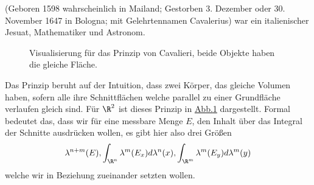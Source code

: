 \documentclass[letterpaper,10pt,german]{jupyterBook}
\let\sphinxpxdimen\pdfpxdimen\else\newdimen\sphinxpxdimen
\begin{document}
\begin{sphinxShadowBox}

\sphinxAtStartPar
{} (Geboren 1598 wahrscheinlich in Mailand; Gestorben 3. Dezember oder 30. November 1647 in Bologna; mit Gelehrtennamen Cavalerius) war ein italienischer Jesuat, Mathematiker und Astronom.
\end{sphinxShadowBox}

\begin{figure}[htbp]
\centering
\capstart

\noindent\sphinxincludegraphics[width=400\sphinxpxdimen]{{cavalieri}.jpg}
\caption{Visualisierung für das Prinzip von Cavalieri, beide Objekte haben die gleiche Fläche.}\label{\detokenize{masstheorie/integrationstechnik:fig-cavalieri}}\end{figure}

\sphinxAtStartPar
Das Prinzip beruht auf der Intuition, dass zwei Körper, das gleiche Volumen haben, sofern alle ihre Schnittflächen welche parallel zu einer Grundfläche verlaufen gleich sind. Für \(\R^2\) ist dieses Prinzip in \hyperref[\detokenize{masstheorie/integrationstechnik:fig-cavalieri}]{Abb.\@ \ref{\detokenize{masstheorie/integrationstechnik:fig-cavalieri}}} dargestellt. Formal bedeutet das, dass wir für eine messbare Menge \(E\), den Inhalt über das Integral der Schnitte ausdrücken wollen, es gibt hier also drei Größen
\begin{equation*}
\begin{split}\lambda^{n+m}(E), \int_{\R^n} \lambda^m(E_x) d\lambda^n(x), \int_{\R^m} \lambda^m(E_y) d\lambda^m(y)\end{split}
\end{equation*}
\sphinxAtStartPar
welche wir in Beziehung zueinander setzten wollen.
\end{document}
